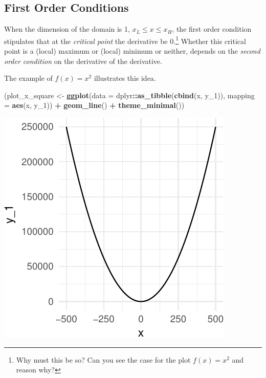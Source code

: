 \documentclass[11pt,]{article}
\newenvironment{Shaded}{\begin{snugshade}}{\end{snugshade}}
\newcommand{\KeywordTok}[1]{\textcolor[rgb]{0.13,0.29,0.53}{\textbf{#1}}}
\newcommand{\DataTypeTok}[1]{\textcolor[rgb]{0.13,0.29,0.53}{#1}}
\newcommand{\DecValTok}[1]{\textcolor[rgb]{0.00,0.00,0.81}{#1}}
\newcommand{\StringTok}[1]{\textcolor[rgb]{0.31,0.60,0.02}{#1}}
\newcommand{\OperatorTok}[1]{\textcolor[rgb]{0.81,0.36,0.00}{\textbf{#1}}}
\newcommand{\NormalTok}[1]{#1}
\let\rmarkdownfootnote\footnote%
\def\footnote{\protect\rmarkdownfootnote}
\begin{document}
\subsection{First Order Conditions}\label{first-order-conditions}

When the dimension of the domain is 1, \(x_L\leq x\leq x_H\), the first
order condition stipulates that at the \emph{critical point} the
derivative be 0.\footnote{Why must this be so? Can you see the case for
  the plot \(f(x) = x^2\) and reason why?} Whether this critical point
is a (local) maximum or (local) minimum or neither, depends on the
\emph{second order condition} on the derivative of the derivative.

The example of \(f(x) = x^2\) illustrates this idea.

\begin{Shaded}
\begin{Highlighting}[]
\NormalTok{(plot_x_square <-}\StringTok{ }\KeywordTok{ggplot}\NormalTok{(}\DataTypeTok{data =}\NormalTok{ dplyr}\OperatorTok{::}\KeywordTok{as_tibble}\NormalTok{(}\KeywordTok{cbind}\NormalTok{(x, y_}\DecValTok{1}\NormalTok{)),}
       \DataTypeTok{mapping =} \KeywordTok{aes}\NormalTok{(x, y_}\DecValTok{1}\NormalTok{)) }\OperatorTok{+}
\StringTok{  }\KeywordTok{geom_line}\NormalTok{() }\OperatorTok{+}
\StringTok{  }\KeywordTok{theme_minimal}\NormalTok{())}
\end{Highlighting}
\end{Shaded}

\begin{center}\includegraphics{Optimization_files/figure-latex/FOC_dim_1-1} \end{center}
\end{document}
